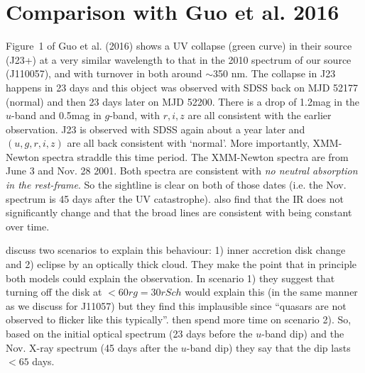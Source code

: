 \documentclass[11pt,a4paper]{article}
\begin{document}
\begin{table}
    \caption{Here, $\alpha$ is the viscosity of the disk; $\rho_{\rm cloud}$ is ; $\rho_{\rm medium}$ is  ;
      $R$ is the radius of the accretion disk; $r_{g}$ is the Gravitational radius; 
      $V_{\rm rel}$ is .}
    \label{tab:timescales}
    \centering
  \end{table}


\section*{Comparison with Guo et al. 2016}
Figure~1 of Guo et al. (2016) shows a UV collapse (green curve) in
their source (J23+) at a very similar wavelength to that in the 2010
spectrum of our source (J110057), and with turnover in both around
$\sim$350 nm.  The collapse in J23 happens in 23 days \citep[Figure 2
of ][]{Guo2016} and this object was observed with SDSS back on MJD
52177 (normal) and then 23 days later on MJD 52200. There is a drop of
1.2mag in the $u$-band and 0.5mag in $g$-band, with $r,i,z$ are all
consistent with the earlier observation. J23 is observed with SDSS
again about a year later and $(u,g,r,i,z)$ are all back consistent
with `normal'. More importantly, XMM-Newton spectra straddle this time
period. The XMM-Newton spectra are from June 3 and Nov. 28 2001. Both
spectra are consistent with {\it no neutral absorption in the
rest-frame}. So the sightline is clear on both of those dates
(i.e. the Nov. spectrum is 45 days after the UV
catastrophe). \citet{Guo2016} also find that the IR does not
significantly change and that the broad lines are consistent with
being constant over time.

\citet{Guo2016} discuss two scenarios to explain this behaviour: 1)
inner accretion disk change and 2) eclipse by an optically thick
cloud. They make the point that in principle both models could explain
the observation. In scenario 1) they suggest that turning off the disk
at $< 60rg = 30 rSch$ would explain this (in the same manner as we
discuss for J11057) but they find this implausible since ``quasars are
not observed to flicker like this typically''.  \citet{Guo2016} then
spend more time on scenario 2). So, based on the initial optical
spectrum (23 days before the $u$-band dip) and the Nov. X-ray spectrum
(45 days after the $u$-band dip) they say that the dip lasts $< 65$
days.





\end{document}
